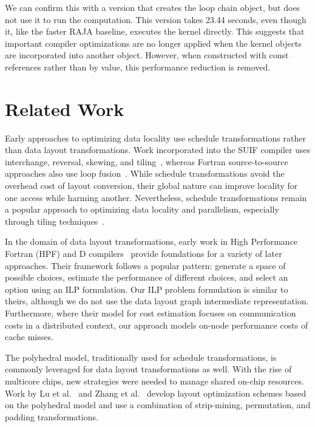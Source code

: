 We can confirm this with a version that creates the loop chain object, but does not use it to run the computation.
This version takes 23.44 seconds, even though it, like the faster RAJA baseline, executes the kernel directly.
This suggests that important compiler optimizations are no longer applied when the kernel objects are incorporated into another object. 
However, when constructed with const references rather than by value, this performance reduction is removed.

\section{Related Work}

Early approaches to optimizing data locality use schedule transformations rather than data layout transformations. 
Work incorporated into the SUIF compiler uses interchange, reversal, skewing, and tiling~\cite{wolf1991data}, whereas Fortran source-to-source approaches also use loop fusion~\cite{mckinley1996improving}.
While schedule transformations avoid the overhead cost of layout conversion, their global nature can improve locality for one access while harming another.
Nevertheless, schedule transformations remain a popular approach to optimizing data locality and parallelism, 
especially through tiling techniques~\cite{bondhugula2008pluto,bertolacci2015parameterized,bondhugula2016diamond,bandishti2012tiling,unat2016tida}.

In the domain of data layout transformations, early work in High Performance Fortran (HPF) and D compilers~\cite{bixby1994automatic,kennedy1995automatic,kennedy1998automatic} provide foundations for a variety of later approaches.
Their framework follows a popular pattern: generate a space of possible choices, estimate the performance of different choices, and select an option using an ILP formulation. 
Our ILP problem formulation is similar to theirs, although we do not use the data layout graph intermediate representation.
Furthermore, where their model for cost estimation focuses on communication costs in a distributed context, our approach models on-node performance costs of cache misses.

The polyhedral model, traditionally used for schedule transformations, is commonly leveraged for data layout transformations as well.
With the rise of multicore chips, new strategies were needed to manage shared on-chip resources. 
Work by Lu et al.~\cite{lu2009data} and Zhang et al.~\cite{zhang2011optimizing} develop layout optimization schemes based on the polyhedral model and use a combination of strip-mining, permutation, and padding transformations.


